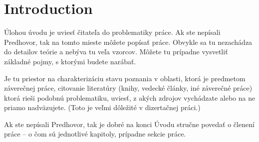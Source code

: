 \chapter{Introduction}

Úlohou úvodu je uviesť čitateľa do problematiky práce. Ak ste nepísali Predhovor, tak na tomto mieste môžete popísať práce. Obvykle sa tu nezachádza do detailov teórie a nebýva tu veľa vzorcov. Môžete tu prípadne vysvetliť základné pojmy, s ktorými budete narábať.

Je tu priestor na charakterizáciu stavu poznania v oblasti, ktorá je predmetom záverečnej práce, citovanie literatúry (knihy, vedecké články, iné záverečné práce) ktorá rieši podobnú problematiku, uviesť, z akých zdrojov vychádzate alebo na ne priamo nadväzujete. (Toto je veľmi dôležité v dizertačnej práci.)

Ak ste nepísali Predhovor, tak je dobré  na konci Úvodu stručne povedať o členení práce -- o čom sú jednotlivé kapitoly, prípadne sekcie práce.
